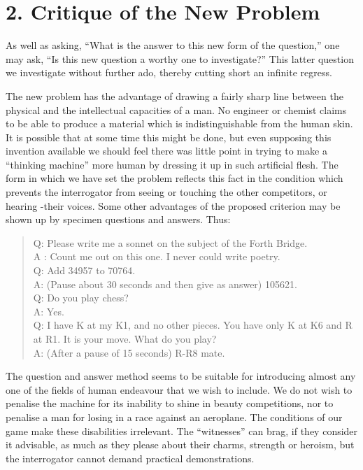 \documentclass[10pt,twoside,openright]{memoir}
\begin{document}
\section{2. Critique of the New Problem}

As well as asking, ``What is the answer to this new form of the question,'' one may ask, ``Is this new question a worthy one to investigate?'' This latter question we investigate without further ado, thereby cutting short an infinite regress.

The new problem has the advantage of drawing a fairly sharp line between the physical and the intellectual capacities of a man. No engineer or chemist claims to be able to produce a material which is indistinguishable from the human skin. It is possible that at some time this might be done, but even supposing this invention available we should feel there was little point in trying to make a ``thinking machine'' more human by dressing it up in such artificial flesh. The form in which we have set the problem reflects this fact in the condition which prevents the interrogator from seeing or touching the other competitors, or hearing -their voices. Some other advantages of the proposed criterion may be shown up by specimen questions and answers. Thus:

\begin{quotation}
\noindent Q: Please write me a sonnet on the subject of the Forth Bridge.\\
A : Count me out on this one. I never could write poetry.\\
Q: Add 34957 to 70764.\\
A: (Pause about 30 seconds and then give as answer) 105621.\\
Q: Do you play chess?\\
A: Yes.\\
Q: I have K at my K1, and no other pieces. You have only K at K6 and R at R1. It is your move. What do you play?\\
A: (After a pause of 15 seconds) R-R8 mate.
\end{quotation}

The question and answer method seems to be suitable for introducing almost any one of the fields of human endeavour that we wish to include. We do not wish to penalise the machine for its inability to shine in beauty competitions, nor to penalise a man for losing in a race against an aeroplane. The conditions of our game make these disabilities irrelevant. The ``witnesses'' can brag, if they consider it advisable, as much as they please about their charms, strength or heroism, but the interrogator cannot demand practical demonstrations.
\end{document}
